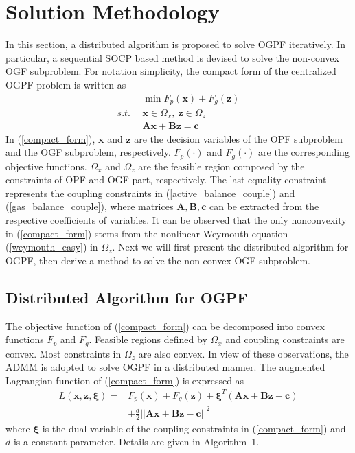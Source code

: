 \documentclass[journal]{IEEEtran}
\begin{document}
\section{Solution Methodology}
In this section, a distributed algorithm is proposed to solve OGPF iteratively. In particular, a sequential SOCP based method is devised to solve the non-convex OGF subproblem. For notation simplicity, the compact form of the centralized OGPF problem is written as
\begin{equation}\label{compact_form}
\begin{split}
&\min F_p({\boldsymbol{{x}}})+F_g({\boldsymbol{{z}}})\\
s.t.~~&{\boldsymbol{{x}}}\in \Omega_{x},~{\boldsymbol{{z}}}\in\Omega_{z}\\
& {\boldsymbol{{Ax}}}+{\boldsymbol{{Bz}}}={\boldsymbol{{c}}}
\end{split}
\end{equation}
In (\ref{compact_form}), ${\boldsymbol{{x}}}$ and ${\boldsymbol{{z}}}$ are the decision variables of the OPF subproblem and the OGF subproblem, respectively. $F_p(\cdot)$ and $F_g(\cdot)$ are the corresponding objective functions. $\Omega_x$ and $\Omega_z$ are the feasible region composed by the constraints of OPF and OGF part, respectively. The last equality constraint represents the coupling constraints in (\ref{active_balance_couple}) and (\ref{gas_balance_couple}), where matrices ${\boldsymbol{{A,B,c}}}$ can be extracted from the respective coefficients of variables. It can be observed that the only nonconvexity in (\ref{compact_form}) stems from the nonlinear Weymouth equation (\ref{weymouth_easy}) in $\Omega_z$. Next we will first present the distributed algorithm for OGPF, then derive a method to solve the non-convex OGF subproblem.

\subsection{Distributed Algorithm for OGPF}
The objective function of (\ref{compact_form}) can be decomposed into convex functions  $F_p$ and $F_g$. Feasible regions defined by $\Omega_x$ and coupling constraints are convex. Most constraints in $\Omega_z$ are also convex. In view of these observations, the ADMM \cite{Boyd_ADMM} is adopted to solve OGPF in a distributed manner. The augmented Lagrangian function of (\ref{compact_form}) is expressed as
\begin{equation}\label{Augmented_Lagrangian}
\begin{split}
  L({\boldsymbol{{x}}},{\boldsymbol{{z}}},{\boldsymbol{{\xi}}})=&F_p({\boldsymbol{{x}}})+F_g({\boldsymbol{{z}}})+{\boldsymbol{{\xi}}}^T({\boldsymbol{{Ax}}}+{\boldsymbol{{Bz}}}-{\boldsymbol{{c}}})\\
  &+\frac{d}{2}||{\boldsymbol{{Ax}}}+{\boldsymbol{{Bz}}}-{\boldsymbol{{c}}}||^2
\end{split}
\end{equation}
where ${\boldsymbol{{\xi}}}$ is the dual variable of the coupling constraints in (\ref{compact_form}) and $d$ is a constant parameter. Details are given in Algorithm~1.
\end{document}
